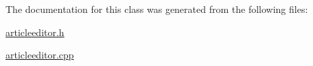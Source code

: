 The documentation for this class was generated from the following files\-:\begin{DoxyCompactItemize}
\item 
\hyperlink{articleeditor_8h}{articleeditor.\-h}\item 
\hyperlink{articleeditor_8cpp}{articleeditor.\-cpp}\end{DoxyCompactItemize}

